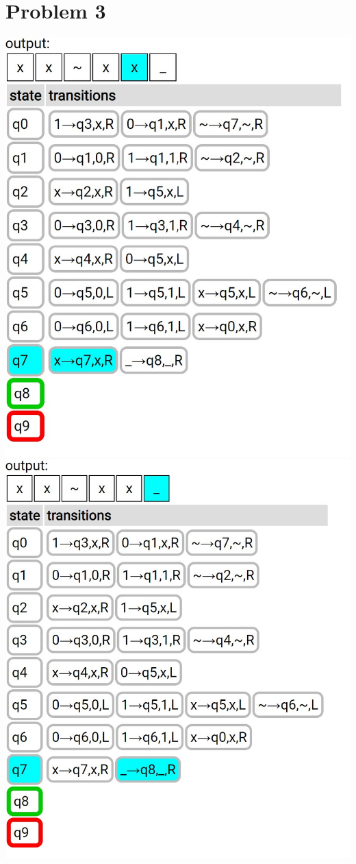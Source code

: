\documentclass{article}
\newenvironment{problem}[1]{
  \nobreak\section*{Problem #1}
}{}
\begin{document}
\begin{problem}{3}
\begin{center}
      \includegraphics[scale=0.5]{images/16.jpg}
      \includegraphics[scale=0.5]{images/17.jpg}

\end{center}
\end{problem}
\end{document}
